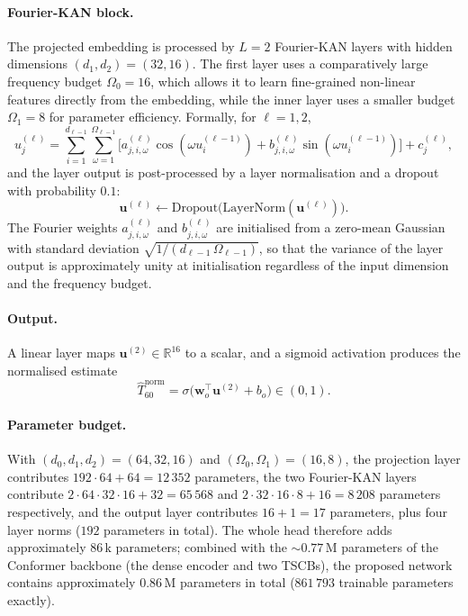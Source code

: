 \documentclass[a4paper,fleqn]{cas-sc}
\begin{document}
\paragraph{Fourier-KAN block.} The projected embedding is processed by
$L=2$ Fourier-KAN layers with hidden dimensions $(d_{1},d_{2})=(32,16)$.
The first layer uses a comparatively large frequency budget
$\Omega_{0}=16$, which allows it to learn fine-grained non-linear
features directly from the embedding, while the inner layer uses a
smaller budget $\Omega_{1}=8$ for parameter efficiency. Formally, for
$\ell=1,2$,
\begin{equation}\label{eq:fourier_block}
  u^{(\ell)}_j = \sum_{i=1}^{d_{\ell-1}}\sum_{\omega=1}^{\Omega_{\ell-1}}
    \bigl[a^{(\ell)}_{j,i,\omega}\cos(\omega u^{(\ell-1)}_i)
        + b^{(\ell)}_{j,i,\omega}\sin(\omega u^{(\ell-1)}_i)\bigr]
    + c^{(\ell)}_j,
\end{equation}
and the layer output is post-processed by a layer normalisation and a
dropout with probability $0.1$:
\begin{equation}\label{eq:fourier_post}
  \mathbf{u}^{(\ell)} \leftarrow \mathrm{Dropout}\bigl(
    \mathrm{LayerNorm}(\mathbf{u}^{(\ell)})\bigr).
\end{equation}
The Fourier weights $a^{(\ell)}_{j,i,\omega}$ and $b^{(\ell)}_{j,i,\omega}$
are initialised from a zero-mean Gaussian with standard deviation
$\sqrt{1/(d_{\ell-1}\,\Omega_{\ell-1})}$, so that the variance of the
layer output is approximately unity at initialisation regardless of the
input dimension and the frequency budget.

\paragraph{Output.} A linear layer maps $\mathbf{u}^{(2)}\in
\mathbb{R}^{16}$ to a scalar, and a sigmoid activation produces the
normalised estimate
\begin{equation}\label{eq:t60_hat}
  \hat{T}_{60}^{\mathrm{norm}} = \sigma\bigl(\mathbf{w}_{o}^{\top}\mathbf{u}^{(2)}
                                            + b_{o}\bigr) \in (0,1).
\end{equation}

\paragraph{Parameter budget.} With $(d_{0},d_{1},d_{2})=(64,32,16)$ and
$(\Omega_{0},\Omega_{1})=(16,8)$, the projection layer contributes
$192\cdot 64+64=12\,352$ parameters, the two Fourier-KAN layers
contribute $2\cdot 64\cdot 32\cdot 16+32 = 65\,568$ and
$2\cdot 32\cdot 16\cdot 8 + 16 = 8\,208$ parameters respectively, and
the output layer contributes $16+1=17$ parameters, plus four layer
norms ($192$ parameters in total). The whole head therefore adds
approximately $86$\,k parameters; combined with the $\sim 0.77$\,M
parameters of the Conformer backbone (the dense encoder and two TSCBs),
the proposed network contains approximately $0.86$\,M parameters in
total ($861\,793$ trainable parameters exactly).
\end{document}

